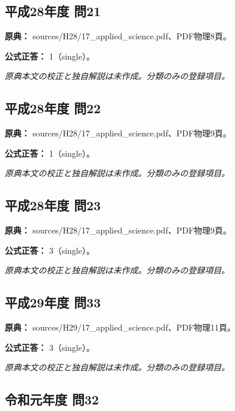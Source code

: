 \subsection{平成28年度 問21}
\label{q:h28-reg-applied-21}

\noindent\textbf{原典：} sources/H28/17\_applied\_science.pdf、PDF物理8頁。

\textbf{公式正答：} 1（single）。

\par\textit{原典本文の校正と独自解説は未作成。分類のみの登録項目。}

\subsection{平成28年度 問22}
\label{q:h28-reg-applied-22}

\noindent\textbf{原典：} sources/H28/17\_applied\_science.pdf、PDF物理9頁。

\textbf{公式正答：} 1（single）。

\par\textit{原典本文の校正と独自解説は未作成。分類のみの登録項目。}

\subsection{平成28年度 問23}
\label{q:h28-reg-applied-23}

\noindent\textbf{原典：} sources/H28/17\_applied\_science.pdf、PDF物理9頁。

\textbf{公式正答：} 3（single）。

\par\textit{原典本文の校正と独自解説は未作成。分類のみの登録項目。}

\subsection{平成29年度 問33}
\label{q:h29-reg-applied-33}

\noindent\textbf{原典：} sources/H29/17\_applied\_science.pdf、PDF物理11頁。

\textbf{公式正答：} 3（single）。

\par\textit{原典本文の校正と独自解説は未作成。分類のみの登録項目。}

\subsection{令和元年度 問32}
\label{q:r01-reg-applied-32}

